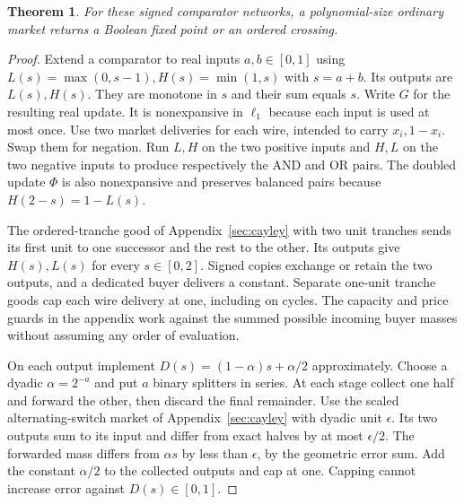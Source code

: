 \documentclass[11pt,oneside,openany,notitlepage]{report}
\newtheorem{theorem}{Theorem}[chapter]
\begin{document}
\begin{theorem}\label{thm:comparator}
For these signed comparator networks, a polynomial-size ordinary market
returns a Boolean fixed point or an ordered crossing.
\end{theorem}
\begin{proof}
Extend a comparator to real inputs \(a,b\in[0,1]\) using
\(L(s)=\max(0,s-1), H(s)=\min(1,s)\) with \(s=a+b\). Its outputs
are \(L(s),H(s)\). They are monotone in \(s\) and their sum equals
\(s\). Write \(G\) for the resulting real update. It is nonexpansive
in \(\ell_1\) because each input is used at most once. Use two market
deliveries for each wire, intended to carry \(x_i,1-x_i\). Swap them
for negation. Run \(L,H\) on the two positive inputs and \(H,L\) on
the two negative inputs to produce respectively the AND and OR pairs.
The doubled update \(\Phi\) is also nonexpansive and preserves balanced
pairs because \(H(2-s)=1-L(s)\).

The ordered-tranche good of Appendix~\ref{sec:cayley} with two unit
tranches sends its first unit to one successor and the rest to the
other. Its outputs give \(H(s),L(s)\) for every \(s\in[0,2]\).
Signed copies exchange or retain the two outputs, and a dedicated buyer
delivers a constant. Separate one-unit tranche goods cap each wire
delivery at one, including on cycles. The capacity and price guards
in the appendix work against the summed possible incoming buyer masses
without assuming any order of evaluation.

On each output implement \(D(s)=(1-\alpha)s+\alpha/2\) approximately.
Choose a dyadic \(\alpha=2^{-a}\) and put \(a\) binary splitters in
series. At each stage collect one half and forward the other, then
discard the final remainder. Use the scaled alternating-switch market
of Appendix~\ref{sec:cayley} with dyadic unit \(\epsilon\). Its two
outputs sum to its input and differ from exact halves by at most
\(\epsilon/2\). The forwarded mass differs from \(\alpha s\) by
less than \(\epsilon\), by the geometric error sum. Add the constant
\(\alpha/2\) to the collected outputs and cap at one. Capping cannot
increase error against \(D(s)\in[0,1]\).


\end{proof}
\end{document}
